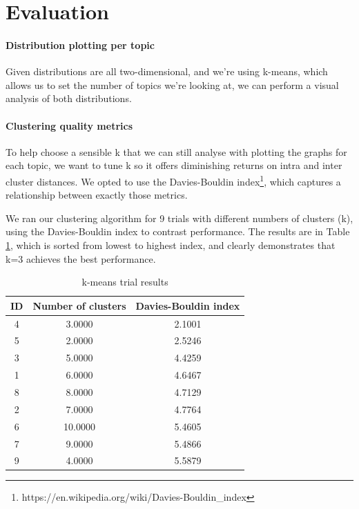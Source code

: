 \documentclass[nonacm,sigconf]{acmart}
\begin{document}
\section{Evaluation}

\paragraph{Distribution plotting per topic} Given distributions are all two-dimensional, and we're using k-means, which allows us to set the number of topics we're looking at, we can perform a visual analysis of both distributions.

\paragraph{Clustering quality metrics} To help choose a sensible k that we can still analyse with plotting the graphs for each topic, we want to tune k so it offers diminishing returns on intra and inter cluster distances. We opted to use the Davies-Bouldin index\footnote{https://en.wikipedia.org/wiki/Davies-Bouldin\_index}, which captures a relationship between exactly those metrics.

We ran our clustering algorithm for 9 trials with different numbers of clusters (k), using the Davies-Bouldin index to contrast performance. The results are in Table \ref{tab:kmeansbest}, which is sorted from lowest to highest index, and clearly demonstrates that k=3 achieves the best performance.

\begin{table}[h]
  \caption{k-means trial results}
  \label{tab:kmeansbest}
  \begin{tabular}{|c|c|c|}
    \hline
    ID & Number of clusters&Davies-Bouldin index\\
    \hline
    4 & 3.0000 & 2.1001 \\
    5 & 2.0000 & 2.5246 \\
    3 & 5.0000 & 4.4259	\\
    1 & 6.0000 & 4.6467 \\
    8 & 8.0000 & 4.7129 \\
    2 & 7.0000 & 4.7764	\\
    6 & 10.0000	& 5.4605 \\
    7 & 9.0000 & 5.4866	\\
    9 & 4.0000 & 5.5879 \\
    \hline
\end{tabular}
\end{table}
\end{document}
